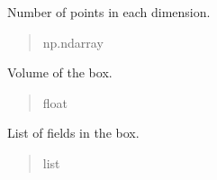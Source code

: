 \documentclass[letterpaper,10pt,english]{sphinxmanual}
\begin{document}
\begin{fulllineitems}
\begin{fulllineitems}
\label{\detokenize{source/Box:Box.Box.point_number}}
\pysigstartsignatures
\pysigline
{}
\pysigstopsignatures
\sphinxAtStartPar
Number of points in each dimension.
\begin{quote}\begin{description}
\sphinxAtStartPar
np.ndarray

\end{description}\end{quote}

\end{fulllineitems}


\begin{fulllineitems}
\label{\detokenize{source/Box:Box.Box.box_volume}}
\pysigstartsignatures
\pysigline
{}
\pysigstopsignatures
\sphinxAtStartPar
Volume of the box.
\begin{quote}\begin{description}
\sphinxAtStartPar
float

\end{description}\end{quote}

\end{fulllineitems}


\begin{fulllineitems}
\label{\detokenize{source/Box:Box.Box.fields}}
\pysigstartsignatures
\pysigline
{}
\pysigstopsignatures
\sphinxAtStartPar
List of fields in the box.
\begin{quote}\begin{description}
\sphinxAtStartPar
list

\end{description}\end{quote}

\end{fulllineitems}



\end{fulllineitems}
\end{document}
